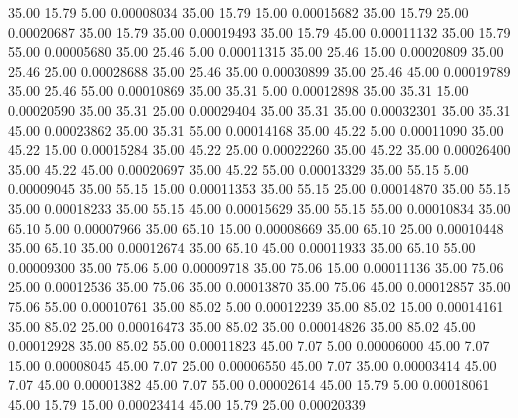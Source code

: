      35.00     15.79      5.00     0.00008034
     35.00     15.79     15.00     0.00015682
     35.00     15.79     25.00     0.00020687
     35.00     15.79     35.00     0.00019493
     35.00     15.79     45.00     0.00011132
     35.00     15.79     55.00     0.00005680
     35.00     25.46      5.00     0.00011315
     35.00     25.46     15.00     0.00020809
     35.00     25.46     25.00     0.00028688
     35.00     25.46     35.00     0.00030899
     35.00     25.46     45.00     0.00019789
     35.00     25.46     55.00     0.00010869
     35.00     35.31      5.00     0.00012898
     35.00     35.31     15.00     0.00020590
     35.00     35.31     25.00     0.00029404
     35.00     35.31     35.00     0.00032301
     35.00     35.31     45.00     0.00023862
     35.00     35.31     55.00     0.00014168
     35.00     45.22      5.00     0.00011090
     35.00     45.22     15.00     0.00015284
     35.00     45.22     25.00     0.00022260
     35.00     45.22     35.00     0.00026400
     35.00     45.22     45.00     0.00020697
     35.00     45.22     55.00     0.00013329
     35.00     55.15      5.00     0.00009045
     35.00     55.15     15.00     0.00011353
     35.00     55.15     25.00     0.00014870
     35.00     55.15     35.00     0.00018233
     35.00     55.15     45.00     0.00015629
     35.00     55.15     55.00     0.00010834
     35.00     65.10      5.00     0.00007966
     35.00     65.10     15.00     0.00008669
     35.00     65.10     25.00     0.00010448
     35.00     65.10     35.00     0.00012674
     35.00     65.10     45.00     0.00011933
     35.00     65.10     55.00     0.00009300
     35.00     75.06      5.00     0.00009718
     35.00     75.06     15.00     0.00011136
     35.00     75.06     25.00     0.00012536
     35.00     75.06     35.00     0.00013870
     35.00     75.06     45.00     0.00012857
     35.00     75.06     55.00     0.00010761
     35.00     85.02      5.00     0.00012239
     35.00     85.02     15.00     0.00014161
     35.00     85.02     25.00     0.00016473
     35.00     85.02     35.00     0.00014826
     35.00     85.02     45.00     0.00012928
     35.00     85.02     55.00     0.00011823
     45.00      7.07      5.00     0.00006000
     45.00      7.07     15.00     0.00008045
     45.00      7.07     25.00     0.00006550
     45.00      7.07     35.00     0.00003414
     45.00      7.07     45.00     0.00001382
     45.00      7.07     55.00     0.00002614
     45.00     15.79      5.00     0.00018061
     45.00     15.79     15.00     0.00023414
     45.00     15.79     25.00     0.00020339
